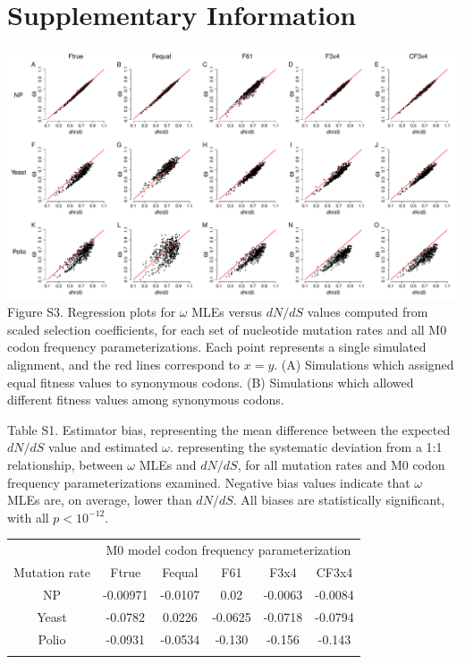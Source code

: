 \documentclass{pnastwo}
\begin{document}
\clearpage

	
\section{Supplementary Information}


\begin{landscape}
\includegraphics[width=9.25in]{figures/SI/nyp_fspecs_full.pdf}
\noindent Figure S3. Regression plots for $\omega$ MLEs versus $dN/dS$ values computed from scaled selection coefficients, for each set of nucleotide mutation rates and all M0 codon frequency parameterizations. Each point represents a single simulated alignment, and the red lines correspond to $x=y$. (A) Simulations which assigned equal fitness values to synonymous codons. (B) Simulations which allowed different fitness values among synonymous codons.
\end{landscape}

\clearpage
\newpage
	
\noindent Table S1. Estimator bias, representing the mean difference between the expected $dN/dS$ value and estimated $\omega$.  representing the systematic deviation from a 1:1 relationship, between $\omega$ MLEs and $dN/dS$, for all mutation rates and M0 codon frequency parameterizations examined. Negative bias values indicate that $\omega$ MLEs are, on average, lower than $dN/dS$. All biases are statistically significant, with all $p < 10^{-12}$.
\begin{table}[htbp]
	\begin{tabular}{c c c c c c}
		\hline\noalign{\smallskip}
		& \multicolumn{5}{c}{M0 model codon frequency parameterization} \\
		\cline{2-6}\noalign{\medskip}
		Mutation rate & Ftrue & Fequal & F61 & F3x4 & CF3x4 \\
		\hline\noalign{\smallskip}
		NP & -0.00971 & -0.0107 & 0.02 & -0.0063 & -0.0084 \\
		Yeast & -0.0782 & 0.0226 & -0.0625 & -0.0718 & -0.0794 \\
		Polio & -0.0931 & -0.0534 & -0.130 & -0.156 & -0.143 \\
		\noalign{\smallskip}\hline\noalign{\smallskip}
	\end{tabular}
\end{table}	
	
\end{document}
